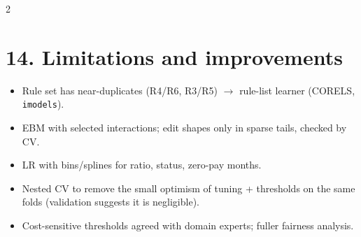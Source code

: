 \documentclass[a4paper,9pt]{extarticle}
\begin{document}
\begin{multicols}{2}
\section{14. Limitations and improvements}
\begin{itemize}
\item Rule set has near-duplicates (R4/R6, R3/R5) $\to$ rule-list learner (CORELS, \texttt{imodels}).
\item EBM with selected interactions; edit shapes only in sparse tails, checked by CV.
\item LR with bins/splines for ratio, status, zero-pay months.
\item Nested CV to remove the small optimism of tuning + thresholds on the same folds (validation suggests it is
      negligible).
\item Cost-sensitive thresholds agreed with domain experts; fuller fairness analysis.
\end{itemize}

\end{multicols}
\end{document}
